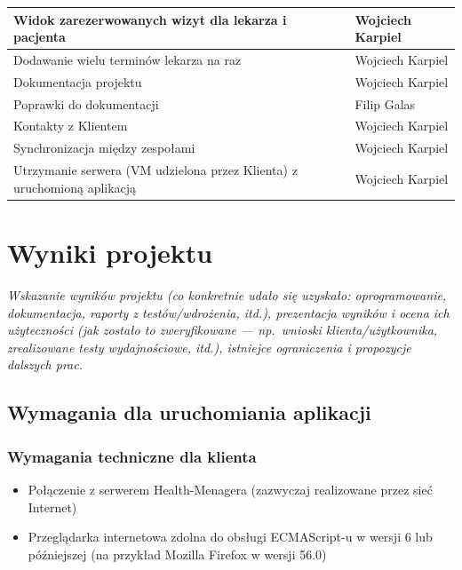 \documentclass[polish,12pt]{aghthesis}
\begin{document}
\begin{center}
\begin{tabular}{ | l | l | }
    Widok zarezerwowanych wizyt dla lekarza i pacjenta & Wojciech Karpiel \\ \hline
    Dodawanie wielu terminów lekarza na raz & Wojciech Karpiel \\ \hline
    Dokumentacja projektu & Wojciech Karpiel \\ \hline
    Poprawki do dokumentacji & Filip Galas \\ \hline
    Kontakty z Klientem & Wojciech Karpiel \\ \hline
    Synchronizacja między zespołami & Wojciech Karpiel \\ \hline
    Utrzymanie serwera (VM udzielona przez Klienta) z uruchomioną aplikacją & Wojciech Karpiel \\ \hline
  \end{tabular}
\end{center}



\section{Wyniki projektu}

\label{sec:wyniki-projektu}

\emph{Wskazanie wyników projektu (co konkretnie udało się uzyskało:
  oprogramowanie, dokumentacja, raporty z testów/wdrożenia, itd.), prezentacja wyników
  i ocena ich użyteczności (jak zostało to zweryfikowane --- np.\ wnioski
  klienta/użytkownika, zrealizowane testy wydajnościowe, itd.),
  istniejce ograniczenia i propozycje dalszych prac.}

\subsection{Wymagania dla uruchomiania aplikacji}
\subsubsection{Wymagania techniczne dla klienta}
\begin{itemize}
  \item  Połączenie z serwerem Health-Menagera (zazwyczaj realizowane przez sieć Internet)
  \item Przeglądarka internetowa zdolna do obsługi ECMAScript-u w wersji 6 lub późniejszej (na przykład Mozilla Firefox w wersji 56.0)
\end{itemize}
\end{document}
